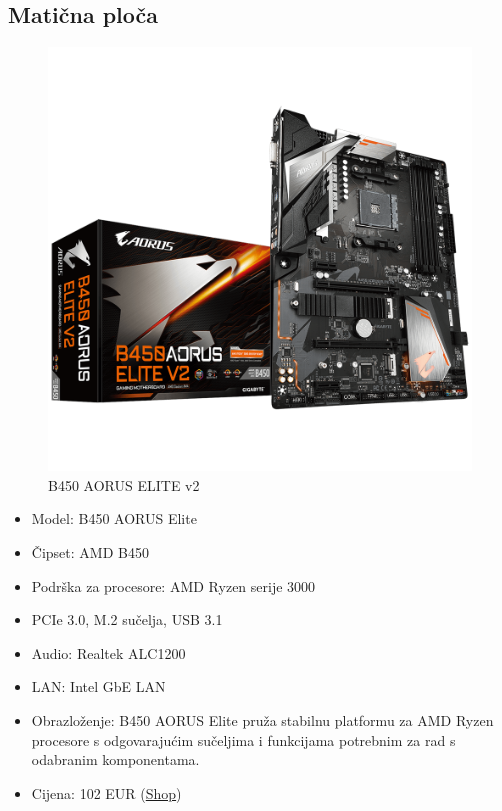 \documentclass{article}
\begin{document}
\subsection{Matična ploča}
\begin{figure}[H]
    \centering
    \includegraphics[width = \textwidth]{Slike/Maticna.jpg}
    \caption{B450 AORUS ELITE v2}
    \label{fig:Matična}
\end{figure}
\begin{itemize}
    \item Model: B450 AORUS Elite
    \item Čipset: AMD B450
    \item Podrška za procesore: AMD Ryzen serije 3000
    \item PCIe 3.0, M.2 sučelja, USB 3.1
    \item Audio: Realtek ALC1200
    \item LAN: Intel GbE LAN
    \item Obrazloženje: B450 AORUS Elite pruža stabilnu platformu za AMD Ryzen procesore s odgovarajućim sučeljima i funkcijama potrebnim za rad s odabranim komponentama.
    \item Cijena: 102 EUR (\href{https://laptopi.hr/informatika/komponente/maticne-ploce/motherboard-b450-aorus-elite-v2-am4-4ddr4-dvi-hdmi-m-2-atx-detail?utm_source=nabava.net&utm_campaign=nabava.net&utm_medium=click}{Shop})
\end{itemize}
\end{document}
